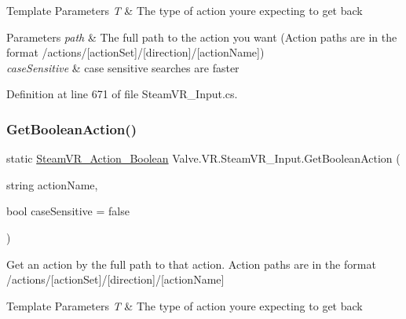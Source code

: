 \begin{DoxyTemplParams}{Template Parameters}
{\em T} & The type of action you\textquotesingle{}re expecting to get back\\
\hline
\end{DoxyTemplParams}

\begin{DoxyParams}{Parameters}
{\em path} & The full path to the action you want (Action paths are in the format /actions/\mbox{[}action\+Set\mbox{]}/\mbox{[}direction\mbox{]}/\mbox{[}action\+Name\mbox{]})\\
\hline
{\em case\+Sensitive} & case sensitive searches are faster\\
\hline
\end{DoxyParams}


Definition at line 671 of file Steam\+V\+R\+\_\+\+Input.\+cs.

\mbox{\label{class_valve_1_1_v_r_1_1_steam_v_r___input_ad899a1104e3be4772cae55c0eb6e350e}} 
\subsubsection{\texorpdfstring{GetBooleanAction()}{GetBooleanAction()}\hspace{0.1cm}{\footnotesize\ttfamily [2/2]}}
{\footnotesize\ttfamily static \mbox{\hyperlink{class_valve_1_1_v_r_1_1_steam_v_r___action___boolean}{Steam\+V\+R\+\_\+\+Action\+\_\+\+Boolean}} Valve.\+V\+R.\+Steam\+V\+R\+\_\+\+Input.\+Get\+Boolean\+Action (\begin{DoxyParamCaption}\item[{string}]{action\+Name,  }\item[{bool}]{case\+Sensitive = {\ttfamily false} }\end{DoxyParamCaption})\hspace{0.3cm}{\ttfamily [static]}}



Get an action by the full path to that action. Action paths are in the format /actions/\mbox{[}action\+Set\mbox{]}/\mbox{[}direction\mbox{]}/\mbox{[}action\+Name\mbox{]} 


\begin{DoxyTemplParams}{Template Parameters}
{\em T} & The type of action you\textquotesingle{}re expecting to get back\\
\hline
\end{DoxyTemplParams}

